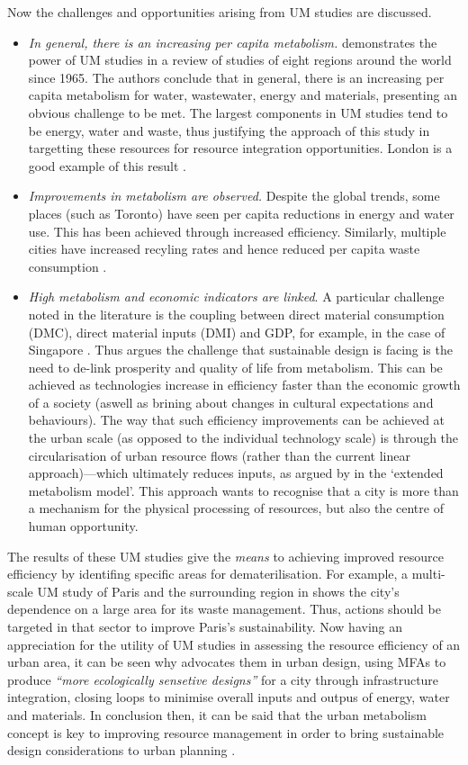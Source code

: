Now the challenges and opportunities arising from UM studies are discussed.
\begin{itemize}
	\item \emph{In general, there is an increasing per capita metabolism.} \citet{Kennedy2008} demonstrates the power of UM studies in a review of studies of eight regions around the world since 1965. The authors conclude that in general, there is an increasing per capita metabolism for water, wastewater, energy and materials, presenting an obvious challenge to be met. The largest components in UM studies tend to be energy, water and waste, thus justifying the approach of this study in targetting these resources for resource integration opportunities. London is a good example of this result \citep{BFF2002}.
	\item \emph{Improvements in metabolism are observed.} Despite the global trends, some places (such as Toronto) have seen per capita reductions in energy and water use. This has been achieved through increased efficiency. Similarly, multiple cities have increased recyling rates and hence reduced per capita waste consumption \citep{Kennedy2008}. 
	\item \emph{High metabolism and economic indicators are linked}. A particular challenge noted in the literature is the coupling between direct material consumption (DMC), direct material inputs (DMI) and GDP, for example, in the case of Singapore \citep{Shulz2007}. Thus \citet{Kowalski2013} argues the challenge that sustainable design is facing is the need to de-link prosperity and quality of life from metabolism. This can be achieved as technologies increase in efficiency faster than the economic growth of a society (aswell as brining about changes in cultural expectations and behaviours). The way that such efficiency improvements can be achieved at the urban scale (as opposed to the individual technology scale) is through the circularisation of urban resource flows (rather than the current linear approach)---which ultimately reduces inputs, as argued by \citet{Newman1999} in the `extended metabolism model'. This approach wants to recognise that a city is more than a mechanism for the physical processing of resources, but also the centre of human opportunity. 
\end{itemize} 
The results of these UM studies give the \emph{means} to achieving improved resource efficiency by identifing specific areas for dematerilisation. For example, a multi-scale UM study of Paris and the surrounding region in \citet{Barles2009} shows the city's dependence on a large area for its waste management. Thus, actions should be targeted in that sector to improve Paris's sustainability. Now having an appreciation for the utility of UM studies in assessing the resource efficiency of an urban area, it can be seen why \citet{Kennedy2011} advocates them in urban design, using MFAs to produce \emph{``more ecologically sensetive designs''} for a city through infrastructure integration, closing loops to minimise overall inputs and outpus of energy, water and materials. In conclusion then, it can be said that the urban metabolism concept is key to improving resource management in order to bring sustainable design considerations to urban planning \citep{Agudelo-Vera2011}.

